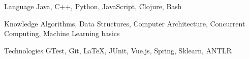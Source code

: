 

\begin{cvskills}

  \cvskill
    {Language} %
    {Java, C++, Python, JavaScript, Clojure, Bash} %

  \cvskill
    {Knowledge} %
    {Algorithms, Data Structures, Computer Architecture, Concurrent Computing, Machine Learning basics} %

  \cvskill
    {Technologies} %
    {GTest, Git, \LaTeX, JUnit, Vue.js, Spring, Sklearn, ANTLR} %

\end{cvskills}
